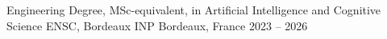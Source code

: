 
\begin{cventries}
  \cventry
    {Engineering Degree, MSc-equivalent, in Artificial Intelligence and Cognitive Science}
    {ENSC, Bordeaux INP}
    {Bordeaux, France}
    {2023 -- 2026}
    {}
\end{cventries}
